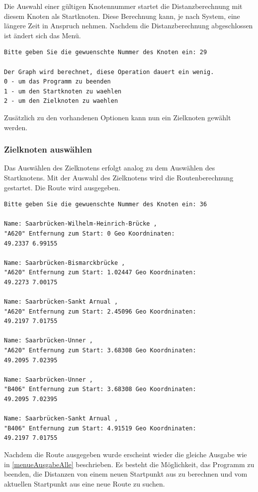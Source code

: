 \documentclass[12pt, a4paper, ngerman]{article}
\begin{document}
Die Auswahl einer gültigen Knotennummer startet die Distanzberechnung mit diesem Knoten als Startknoten. Diese Berechnung kann, je nach System, eine längere Zeit in Anspruch nehmen. Nachdem die Distanzberechnung abgeschlossen ist ändert sich das Menü.
\begin{lstlisting}[label=menueAusgabeAlle]
Bitte geben Sie die gewuenschte Nummer des Knoten ein: 29

Der Graph wird berechnet, diese Operation dauert ein wenig.
0 - um das Programm zu beenden
1 - um den Startknoten zu waehlen
2 - um den Zielknoten zu waehlen
\end{lstlisting}

Zusätzlich zu den vorhandenen Optionen kann nun ein Zielknoten gewählt werden.

\subsubsection{Zielknoten auswählen}
Das Auswählen des Zielknotens erfolgt analog zu dem Auswählen des Startknotens. Mit der Auswahl des Zielknotens wird die Routenberechnung gestartet. Die Route wird ausgegeben.
\begin{lstlisting}
Bitte geben Sie die gewuenschte Nummer des Knoten ein: 36

Name: Saarbrücken-Wilhelm-Heinrich-Brücke , 
"A620" Entfernung zum Start: 0 Geo Koordninaten: 
49.2337 6.99155

Name: Saarbrücken-Bismarckbrücke , 
"A620" Entfernung zum Start: 1.02447 Geo Koordninaten: 
49.2273 7.00175

Name: Saarbrücken-Sankt Arnual , 
"A620" Entfernung zum Start: 2.45096 Geo Koordninaten: 
49.2197 7.01755

Name: Saarbrücken-Unner , 
"A620" Entfernung zum Start: 3.68308 Geo Koordninaten: 
49.2095 7.02395

Name: Saarbrücken-Unner , 
"B406" Entfernung zum Start: 3.68308 Geo Koordninaten: 
49.2095 7.02395

Name: Saarbrücken-Sankt Arnual , 
"B406" Entfernung zum Start: 4.91519 Geo Koordninaten: 
49.2197 7.01755
\end{lstlisting}

Nachdem die Route ausgegeben wurde erscheint wieder die gleiche Ausgabe wie in \ref{menueAusgabeAlle} beschrieben. Es besteht die Möglichkeit, das Programm zu beenden, die Distanzen von einem neuen Startpunkt aus zu berechnen und vom aktuellen Startpunkt aus eine neue Route zu suchen.
\end{document}
